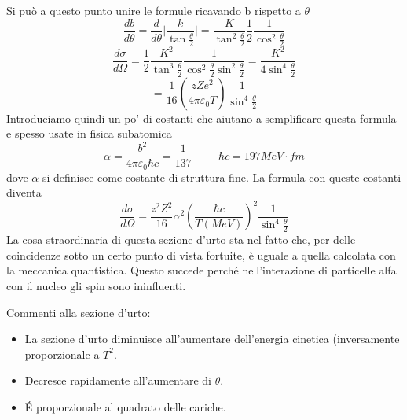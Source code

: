 Si può a questo punto unire le formule ricavando b rispetto a $\theta$ 
\[\frac{db}{d\theta}=\frac{d}{d\theta}\biggl|\frac{k}{\tan\frac{\theta}{2}}\biggl|=\frac{K}{\tan^2 \frac{\theta}{2}}\frac{1}{2}\frac{1}{\cos^2\frac{\theta}{2}}\]
\[\frac{d\sigma}{d\Omega}=\frac{1}{2}\frac{K^2}{\tan^3 \frac{\theta}{2}}\frac{1}{\cos^2\frac{\theta}{2}\sin^2\frac{\theta}{2}}=\frac{K^2}{4\sin^4\frac{\theta}{2}}\]
\[=\frac{1}{16}\left(\frac{zZe^2}{4\pi\varepsilon_0 T}\right)\frac{1}{\sin^4\frac{\theta}{2}}\]
Introduciamo quindi un po' di costanti che aiutano a semplificare questa formula e spesso usate in fisica subatomica
\[\alpha=\frac{b^2}{4\pi\varepsilon_0\hbar c}=\frac{1}{137}\hspace{1cm}\hbar c=197 MeV\cdot fm\]
dove $\alpha$ si definisce come costante di struttura fine. 
La formula con queste costanti diventa
\[\frac{d\sigma}{d\Omega}=\frac{z^2Z^2}{16}\alpha^2\left(\frac{\hbar c}{T(MeV)}\right)^2 \frac{1}{\sin^4\frac{\theta}{2}}\]
La cosa straordinaria di questa sezione d'urto sta nel fatto che, per delle coincidenze sotto un certo punto di vista fortuite, è uguale a quella calcolata con la meccanica quantistica. Questo succede perché nell'interazione di particelle alfa con il nucleo gli spin sono ininfluenti. 

Commenti alla sezione d'urto:
\begin{itemize}
\item La sezione d'urto diminuisce all'aumentare dell'energia cinetica (inversamente proporzionale a $T^2$.
\item Decresce rapidamente all'aumentare di $\theta$.
\item \'E proporzionale al quadrato delle cariche.
\end{itemize}



